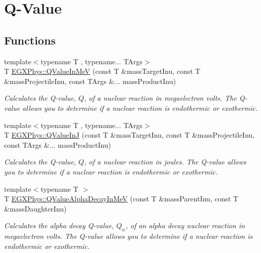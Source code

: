 \hypertarget{group___q_value}{}\section{Q-\/\+Value}
\label{group___q_value}
\subsection*{Functions}
\begin{DoxyCompactItemize}
\item 
{\footnotesize template$<$typename T , typename... T\+Args$>$ }\\T \hyperlink{group___q_value_ga40937601d7aa0aac2a7ca005ef2d2a8b}{E\+G\+X\+Phys\+::\+Q\+Value\+In\+MeV} (const T \&mass\+Target\+Inu, const T \&mass\+Projectile\+Inu, const T\+Args \&... mass\+Product\+Inu)
\begin{DoxyCompactList}\small\item\em Calculates the Q-\/value, $Q$, of a nuclear reaction in megaelectron volts. The Q-\/value allows you to determine if a nuclear reaction is endothermic or exothermic. \end{DoxyCompactList}\item 
{\footnotesize template$<$typename T , typename... T\+Args$>$ }\\T \hyperlink{group___q_value_ga377e1e8298a32359ac68025fb1dd8151}{E\+G\+X\+Phys\+::\+Q\+Value\+InJ} (const T \&mass\+Target\+Inu, const T \&mass\+Projectile\+Inu, const T\+Args \&... mass\+Product\+Inu)
\begin{DoxyCompactList}\small\item\em Calculates the Q-\/value, $Q$, of a nuclear reaction in joules. The Q-\/value allows you to determine if a nuclear reaction is endothermic or exothermic. \end{DoxyCompactList}\item 
{\footnotesize template$<$typename T $>$ }\\T \hyperlink{group___q_value_ga18e054c21cd5f87744e9f5aadc959a54}{E\+G\+X\+Phys\+::\+Q\+Value\+Alpha\+Decay\+In\+MeV} (const T \&mass\+Parent\+Inu, const T \&mass\+Daughter\+Inu)
\begin{DoxyCompactList}\small\item\em Calculates the alpha decay Q-\/value, $Q_{\alpha}$, of an alpha decay nuclear reaction in megaelectron volts. The Q-\/value allows you to determine if a nuclear reaction is endothermic or exothermic. \end{DoxyCompactList}\item 

\end{DoxyCompactItemize}

